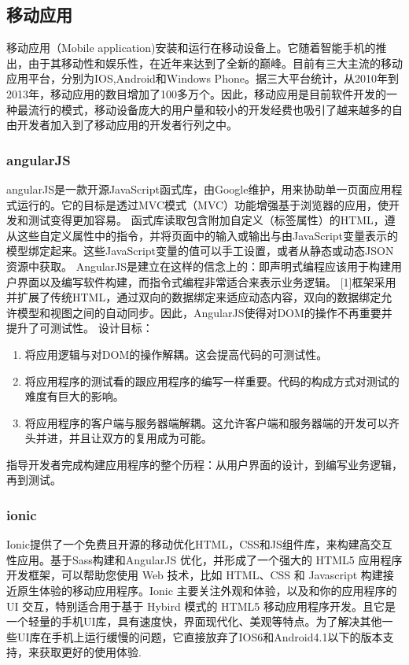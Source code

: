 \subsection{移动应用}
移动应用（Mobile application)安装和运行在移动设备上。它随着智能手机的推出，由于其移动性和娱乐性，在近年来达到了全新的巅峰。目前有三大主流的移动应用平台，分别为IOS,Android和Windows Phone。据三大平台统计，从2010年到2013年，移动应用的数目增加了100多万个。因此，移动应用是目前软件开发的一种最流行的模式，移动设备庞大的用户量和较小的开发经费也吸引了越来越多的自由开发者加入到了移动应用的开发者行列之中。
\subsubsection{angularJS}
angularJS是一款开源JavaScript函式库，由Google维护，用来协助单一页面应用程式运行的。它的目标是透过MVC模式（MVC）功能增强基于浏览器的应用，使开发和测试变得更加容易。
函式库读取包含附加自定义（标签属性）的HTML，遵从这些自定义属性中的指令，并将页面中的输入或输出与由JavaScript变量表示的模型绑定起来。这些JavaScript变量的值可以手工设置，或者从静态或动态JSON资源中获取。
AngularJS是建立在这样的信念上的：即声明式编程应该用于构建用户界面以及编写软件构建，而指令式编程非常适合来表示业务逻辑。 [1]框架采用并扩展了传统HTML，通过双向的数据绑定来适应动态内容，双向的数据绑定允许模型和视图之间的自动同步。因此，AngularJS使得对DOM的操作不再重要并提升了可测试性。
设计目标：
\begin{enumerate}
\item 将应用逻辑与对DOM的操作解耦。这会提高代码的可测试性。
\item 将应用程序的测试看的跟应用程序的编写一样重要。代码的构成方式对测试的难度有巨大的影响。
\item 将应用程序的客户端与服务器端解耦。这允许客户端和服务器端的开发可以齐头并进，并且让双方的复用成为可能。
\end{enumerate}
指导开发者完成构建应用程序的整个历程：从用户界面的设计，到编写业务逻辑，再到测试。
\subsubsection{ionic}
Ionic提供了一个免费且开源的移动优化HTML，CSS和JS组件库，来构建高交互性应用。基于Sass构建和AngularJS 优化，并形成了一个强大的 HTML5 应用程序开发框架，可以帮助您使用 Web 技术，比如 HTML、CSS 和 Javascript 构建接近原生体验的移动应用程序。Ionic 主要关注外观和体验，以及和你的应用程序的 UI 交互，特别适合用于基于 Hybird 模式的 HTML5 移动应用程序开发。且它是一个轻量的手机UI库，具有速度快，界面现代化、美观等特点。为了解决其他一些UI库在手机上运行缓慢的问题，它直接放弃了IOS6和Android4.1以下的版本支持，来获取更好的使用体验.


